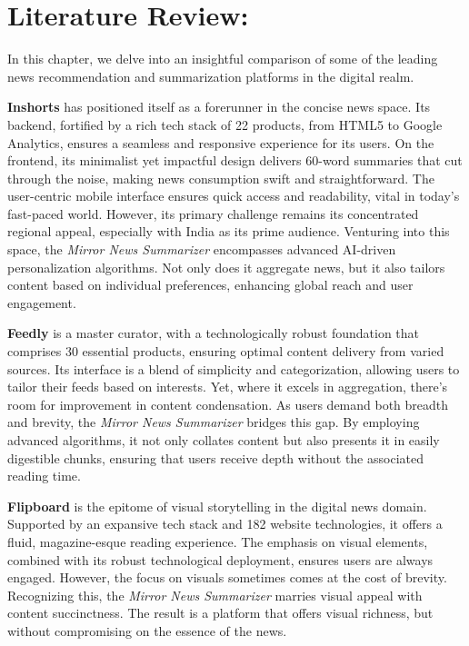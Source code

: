 \documentclass[a4paper]{article}
\begin{document}
\section{Literature Review:}

In this chapter, we delve into an insightful comparison of some of the leading news recommendation and summarization platforms in the digital realm. 

\textbf{Inshorts}\cite{ref_web1} has positioned itself as a forerunner in the concise news space. Its backend, fortified by a rich tech stack of 22 products, from HTML5 to Google Analytics, ensures a seamless and responsive experience for its users.\cite{ref_web4} On the frontend, its minimalist yet impactful design delivers 60-word summaries that cut through the noise, making news consumption swift and straightforward. The user-centric mobile interface ensures quick access and readability, vital in today’s fast-paced world. However, its primary challenge remains its concentrated regional appeal, especially with India as its prime audience. Venturing into this space, the \textit{Mirror News Summarizer} encompasses advanced AI-driven personalization algorithms. Not only does it aggregate news, but it also tailors content based on individual preferences, enhancing global reach and user engagement.

\textbf{Feedly}\cite{ref_web2} is a master curator, with a technologically robust foundation that comprises 30 essential products, ensuring optimal content delivery from varied sources.\cite{ref_web5} Its interface is a blend of simplicity and categorization, allowing users to tailor their feeds based on interests. Yet, where it excels in aggregation, there's room for improvement in content condensation. As users demand both breadth and brevity, the \textit{Mirror News Summarizer} bridges this gap. By employing advanced algorithms, it not only collates content but also presents it in easily digestible chunks, ensuring that users receive depth without the associated reading time.

\textbf{Flipboard}\cite{ref_web3} is the epitome of visual storytelling in the digital news domain. Supported by an expansive tech stack and 182 website technologies, it offers a fluid, magazine-esque reading experience.\cite{ref_web6} The emphasis on visual elements, combined with its robust technological deployment, ensures users are always engaged. However, the focus on visuals sometimes comes at the cost of brevity. Recognizing this, the \textit{Mirror News Summarizer} marries visual appeal with content succinctness. The result is a platform that offers visual richness, but without compromising on the essence of the news.
\end{document}
